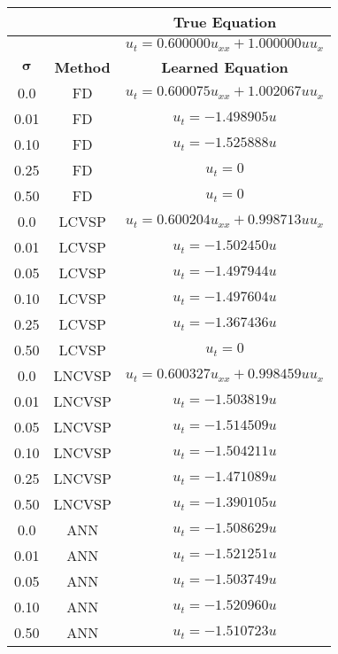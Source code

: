 \begin{tabular}{|c|c|c|}
    \hline
      &  & \textbf{True Equation} \\ 
    \hline
      &  & $u_t = 0.600000u_{xx} + 1.000000uu_{x}$  \\  
    \hline
    $\mathbf{\sigma}$ & \textbf{Method} & \textbf{Learned Equation} \\ 
    \hline
    0.0  &   FD   &   $u_t = 0.600075u_{xx} + 1.002067uu_{x}$ \\ 
    \hline
    0.01  &   FD   &   $u_t = -1.498905u$ \\ 
    \hline
    0.10  &   FD   &   $u_t = -1.525888u$ \\ 
    \hline
    0.25  &   FD   &   $u_t = 0$ \\ 
    \hline
    0.50  &   FD   &   $u_t = 0$ \\ 
    \hline
    0.0  &   LCVSP   &   $u_t = 0.600204u_{xx} + 0.998713uu_{x}$ \\ 
    \hline
    0.01  &   LCVSP   &   $u_t = -1.502450u$ \\ 
    \hline
    0.05  &   LCVSP   &   $u_t = -1.497944u$ \\ 
    \hline
    0.10  &   LCVSP   &   $u_t = -1.497604u$ \\ 
    \hline
    0.25  &   LCVSP   &   $u_t = -1.367436u$ \\ 
    \hline
    0.50  &   LCVSP   &   $u_t = 0$ \\ 
    \hline
    0.0  &   LNCVSP   &   $u_t = 0.600327u_{xx} + 0.998459uu_{x}$ \\ 
    \hline
    0.01  &   LNCVSP   &   $u_t = -1.503819u$ \\ 
    \hline
    0.05  &   LNCVSP   &   $u_t = -1.514509u$ \\ 
    \hline
    0.10  &   LNCVSP   &   $u_t = -1.504211u$ \\ 
    \hline
    0.25  &   LNCVSP   &   $u_t = -1.471089u$ \\ 
    \hline
    0.50  &   LNCVSP   &   $u_t = -1.390105u$ \\ 
    \hline
    0.0  &   ANN   &   $u_t = -1.508629u$ \\ 
    \hline
    0.01  &   ANN   &   $u_t = -1.521251u$ \\ 
    \hline
    0.05  &   ANN   &   $u_t = -1.503749u$ \\ 
    \hline
    0.10  &   ANN   &   $u_t = -1.520960u$ \\ 
    \hline
    0.50  &   ANN   &   $u_t = -1.510723u$ \\ 
    \hline
\end{tabular}